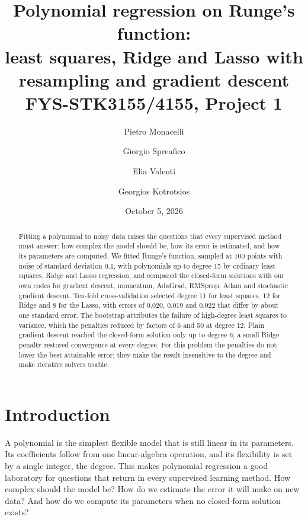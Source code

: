 \documentclass[aps,reprint,amsmath,amssymb,nofootinbib,floatfix]{revtex4-2}
\begin{document}
\raggedbottom

\title{Polynomial regression on Runge's function:\\ least squares, Ridge and Lasso with resampling and gradient descent\\[2pt]
\normalsize FYS-STK3155/4155, Project 1}

\author{Pietro Monacelli}
\author{Giorgio Spreafico}
\author{Elia Valenti}
\author{Georgios Kotrotsios}
\date{October 5, 2026}

\begin{abstract}
Fitting a polynomial to noisy data raises the questions that every supervised method must answer:
how complex the model should be, how its error is estimated, and how its parameters are computed.
We fitted Runge's function, sampled at 100 points with noise of standard deviation 0.1, with
polynomials up to degree 15 by ordinary least squares, Ridge and Lasso regression, and compared
the closed-form solutions with our own codes for gradient descent, momentum, AdaGrad, RMSprop,
Adam and stochastic gradient descent. Ten-fold cross-validation selected degree 11 for least
squares, 12 for Ridge and 8 for the Lasso, with errors of 0.020, 0.019 and 0.022 that differ by
about one standard error. The bootstrap attributes the failure of high-degree least squares to
variance, which the penalties reduced by factors of 6 and 50 at degree 12. Plain gradient descent
reached the closed-form solution only up to degree 6; a small Ridge penalty restored convergence
at every degree. For this problem the penalties do not lower the best attainable error; they make
the result insensitive to the degree and make iterative solvers usable.
\end{abstract}

\maketitle

\section{Introduction}\label{sec:intro}

A polynomial is the simplest flexible model that is still linear in its parameters. Its
coefficients follow from one linear-algebra operation, and its flexibility is set by a single
integer, the degree. This makes polynomial regression a good laboratory for questions that return
in every supervised learning method. How complex should the model be? How do we estimate the error
it will make on new data? And how do we compute its parameters when no closed-form solution
exists?
\end{document}
